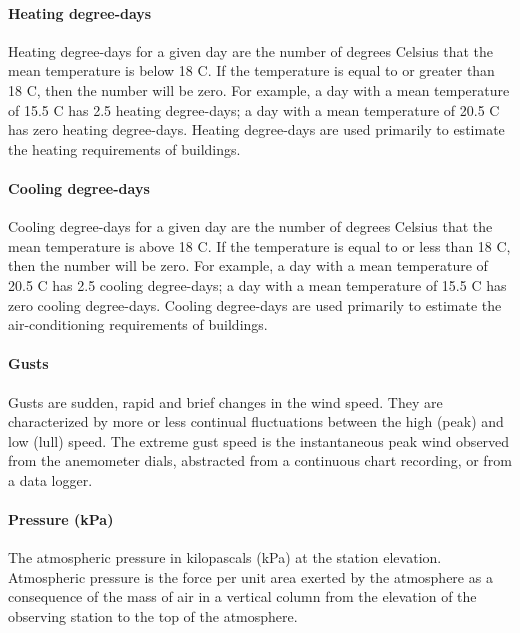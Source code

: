 \documentclass[a4paper,11pt]{article}
\begin{document}
\paragraph{Heating degree-days}
Heating degree-days for a given day are the number of degrees Celsius that the mean temperature is below 18 C. If the temperature is equal to or greater than 18 C, then the number will be zero. For example, a day with a mean temperature of 15.5 C has 2.5 heating degree-days; a day with a mean temperature of 20.5 C has zero heating degree-days. Heating degree-days are used primarily to estimate the heating requirements of buildings.

\paragraph{Cooling degree-days}
Cooling degree-days for a given day are the number of degrees Celsius that the mean temperature is above 18 C. If the temperature is equal to or less than 18 C, then the number will be zero. For example, a day with a mean temperature of 20.5 C has 2.5 cooling degree-days; a day with a mean temperature of 15.5 C has zero cooling degree-days. Cooling degree-days are used primarily to estimate the air-conditioning requirements of buildings.

\paragraph{Gusts}
Gusts are sudden, rapid and brief changes in the wind speed. They are characterized by more or less continual fluctuations between the high (peak) and low (lull) speed. The extreme gust speed is the instantaneous peak wind observed from the anemometer dials, abstracted from a continuous chart recording, or from a data logger.

\paragraph{Pressure (kPa)}
The atmospheric pressure in kilopascals (kPa) at the station elevation. Atmospheric pressure is the force per unit area exerted by the atmosphere as a consequence of the mass of air in a vertical column from the elevation of the observing station to the top of the atmosphere.
\end{document}
